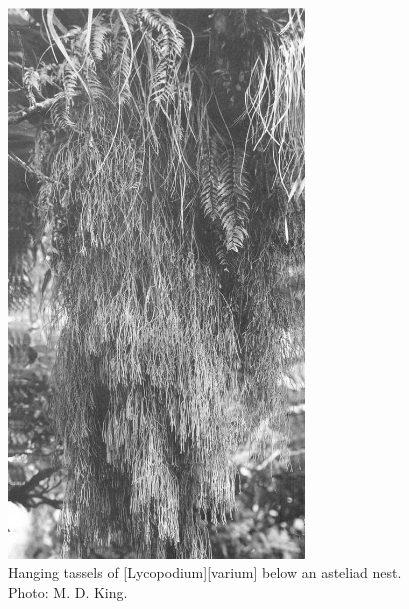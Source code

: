 \begin{figure}[htb]
	\centering
	\begin{minipage}[t]{0.553\textwidth}
		\centering
		\includegraphics[width=0.7\textwidth]{graphics/figure42lycopodium.jpg}
    	\caption[Hanging tassels of Lycopodium varium]{Hanging tassels of [Lycopodium][varium] below an asteliad nest.
    	Photo: M. D. King.}%
    	\label{fig:42lycopodium}
	\end{minipage}\hfill%
	\begin{minipage}[t]{0.427\textwidth}
    	\centering

\end{minipage}
\end{figure}
